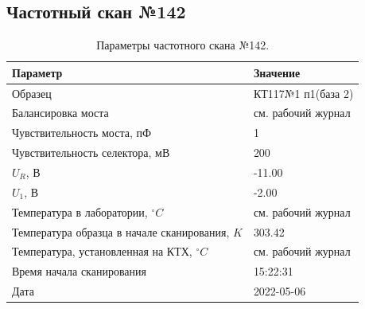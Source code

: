 \subsection{Частотный скан №142}
\begin{table}[!ht]
    \centering
    \caption{Параметры частотного скана №142.}
    \begin{tabular}{|l|l|}
        \hline
        Параметр                                       & Значение                  \\ \hline
        Образец                                        & КТ117№1 п1(база 2)        \\ \hline
        Балансировка моста                             & см. рабочий журнал        \\ \hline
        Чувствительность моста, пФ                     & 1                         \\ \hline
        Чувствительность селектора, мВ                 & 200                       \\ \hline
        $U_R$, В                                       & -11.00                    \\ \hline
        $U_1$, В                                       & -2.00                     \\ \hline
        Температура в лаборатории, $^\circ C$          & см. рабочий журнал        \\ \hline
        Температура образца в начале сканирования, $K$ & 303.42                    \\ \hline
        Температура, установленная на КТХ, $^\circ C$  & см. рабочий журнал        \\ \hline
        Время начала сканирования                      & 15:22:31                  \\ \hline
        Дата                                           & 2022-05-06                \\ \hline
    \end{tabular}
    \label{table:frequency_scan_142}
\end{table}

